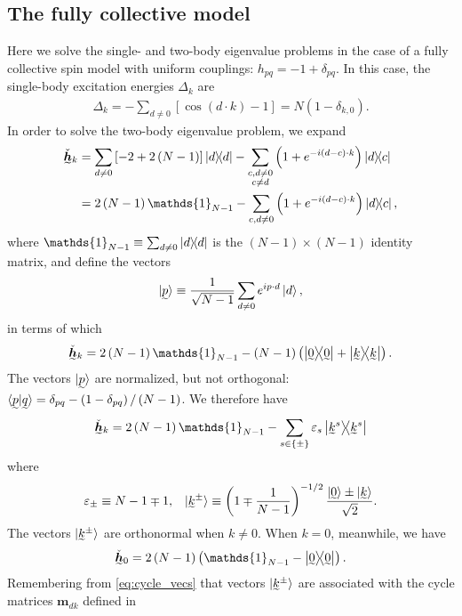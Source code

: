 \documentclass[nofootinbib,notitlepage,11pt]{revtex4-2}
\newcommand{\f}[2]{\dfrac{#1}{#2}} %
\newcommand{\p}[1]{\left(#1\right)} %
\renewcommand{\sp}[1]{\left[#1\right]} %
\renewcommand{\set}[1]{\left\{#1\right\}} %
\renewcommand{\c}{\cdot} %
\newcommand{\m}{\bm} %
\newcommand{\1}{\mathds{1}}
\newcommand{\ut}{\undertilde}
\begin{document}
\subsection{The fully collective model}

Here we solve the single- and two-body eigenvalue problems in the case
of a fully collective spin model with uniform couplings:
$h_{pq}=-1+\delta_{pq}$.  In this case, the single-body excitation
energies $\Delta_k$ are
\begin{align}
  \Delta_k
  = - \sum_{d\ne 0} \sp{\cos\p{d\c k}-1}
  = N \p{1-\delta_{k,0}}.
\end{align}
In order to solve the two-body eigenvalue problem, we expand
\begin{align}
  \ut{\check{\m h}}_k
  &= \sum_{d\ne0} \sp{-2+2\p{N-1}} \op{d}
  - \sum_{\substack{c,d\ne0\\c\ne d}} \p{1+e^{-i\p{d-c}\c k}} \op{d}{c} \\
  &= 2\p{N-1} \1_{N-1}
  - \sum_{c,d\ne0} \p{1+e^{-i\p{d-c}\c k}} \op{d}{c},
\end{align}
where $\1_{N-1}\equiv\sum_{d\ne0}\op{d}$ is the $\p{N-1}\times\p{N-1}$
identity matrix, and define the vectors
\begin{align}
  \ket{\ut{p}}
  \equiv \f1{\sqrt{N-1}} \sum_{d\ne 0} e^{i p\c d}\ket{d},
\end{align}
in terms of which
\begin{align}
  \ut{\check{\m h}}_k
  = 2\p{N-1} \1_{N-1} -\p{N-1} \p{\op{\ut{0}} + \op{\ut{k}}}.
\end{align}
The vectors $\ket{\ut{p}}$ are normalized, but not orthogonal:
$\braket{\ut{p}|\ut{q}}=\delta_{pq}-\p{1-\delta_{pq}}/\p{N-1}$.  We
therefore have
\begin{align}
  \ut{\check{\m h}}_k
  = 2\p{N-1} \1_{N-1} - \sum_{s\in\set{\pm}} \varepsilon_s \op{\ut{k}^s}
\end{align}
where
\begin{align}
  \varepsilon_\pm \equiv N - 1 \mp 1,
  &&
  \ket{\ut{k}^\pm}
  \equiv \p{1\mp\f1{N-1}}^{-1/2}
  \f{\ket{\ut{0}}\pm\ket{\ut{k}}}{\sqrt{2}}.
\end{align}
The vectors $\ket{\ut{k}^\pm}$ are orthonormal when $k\ne0$.  When
$k=0$, meanwhile, we have
\begin{align}
  \ut{\check{\m h}}_0 = 2\p{N-1} \p{\1_{N-1} - \op{\ut{0}}}.
\end{align}
Remembering from \eqref{eq:cycle_vecs} that vectors $\ket{\ut{k}^\pm}$
are associated with the cycle matrices $\m m_{dk}$ defined in
\end{document}
